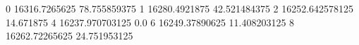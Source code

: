0 16316.7265625 78.755859375
1 16280.4921875 42.521484375
2 16252.642578125 14.671875
4 16237.970703125 0.0
6 16249.37890625 11.408203125
8 16262.72265625 24.751953125
